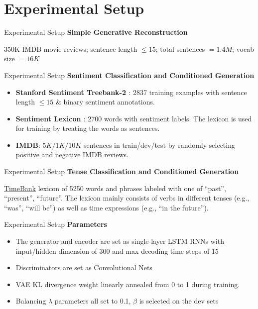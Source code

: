 \documentclass{beamer}
\begin{document}
\section{Experimental Setup}
\begin{frame}{Experimental Setup}
  \textbf{Simple Generative Reconstruction}
  
  350K IMDB movie reviews; sentence length $\leq 15$; total sentences $= 1.4M$; vocab size $= 16K$
\end{frame}

\begin{frame}{Experimental Setup}
  \textbf{Sentiment Classification and Conditioned Generation}
  
  \begin{itemize}
    \item \textbf{Stanford Sentiment Treebank-2 \cite{socher2013recursive}}: 2837 training examples with sentence length $\leq 15$ \& binary sentiment annotations.
    \item \textbf{Sentiment Lexicon \cite{wilson2005recognizing}}:  2700 words with sentiment labels. The lexicon is used for training by treating the words as sentences.
    \item \textbf{IMDB}: $5K/1K/10K$ sentences in train/dev/test by randomly selecting positive and negative IMDB reviews.
  \end{itemize}
  
\end{frame}

\begin{frame}{Experimental Setup}
  \textbf{Tense Classification and Conditioned Generation}
  
  \href{http://timeml.org}{TimeBank} lexicon of 5250 words and phrases labeled with one of {“past”, “present”, “future”}. The lexicon mainly consists of verbs in different tenses (e.g., “was”, “will be”) as well as time expressions (e.g., “in the future”).
\end{frame}

\begin{frame}{Experimental Setup}
  \textbf{Parameters}
  \begin{itemize}
    \item The generator and encoder are set as single-layer LSTM RNNs with input/hidden dimension of 300 and max decoding time-steps of 15
    \item Discriminators are set as Convolutional Nets
    \item VAE KL divergence weight linearly annealed from 0 to 1 during training.
    \item Balancing $\lambda$ parameters all set to 0.1, $\beta$ is selected on the dev sets
  \end{itemize}
\end{frame}
\end{document}
